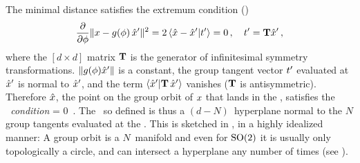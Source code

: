 \documentclass[aip,cha,reprint,
secnumarabic,
nofootinbib, tightenlines,
nobibnotes, showkeys, showpacs,
groupedaddress
]{revtex4-1}
\begin{document}
The minimal distance satisfies
the extremum condition ()
\[
\frac{\partial}{\partial \gSpace} \Norm{\ssp - \LieEl(\gSpace)\,\slicep}^2
   =
2\, \braket{\sspRed - \slicep}{\sliceTan{}}
   = 0
        \,,\quad
\sliceTan{} = \Lg \slicep
\,,
\]
where the $[d\!\times\!d]$ matrix $\mathbf{T}$ is the generator of infinitesimal
symmetry transformations. $\|{g({\bf \phi}){\hat{x}'}}\|$ is a constant,
the group tangent vector $t'_{}$ evaluated at ${\hat{x}'}$
is normal to ${\hat{x}'}$, and the term
$\braket{\slicep}{\Lg \,\slicep}$ vanishes ($\mathbf{T}$ is antisymmetric).
Therefore  $\hat{x}$, the point on the group orbit of $x$ that lands
in the \slice, satisfies the \emph{\slice\ condition}
\beq
\braket{\sspRed}{\sliceTan{}} = 0
    \,.
The \slice\ so defined is thus a $(d\!-\!N)$\dmn\ hyperplane normal to
the $N$ group tangents evaluated at the \slicep. This is sketched in
, in a highly idealized manner: A group orbit is a
$N$\dmn\ manifold and even for $\textrm{SO}(2)$ it is usually only topologically
a circle, and can intersect a hyperplane any number of times  (see
).


\end{document}
